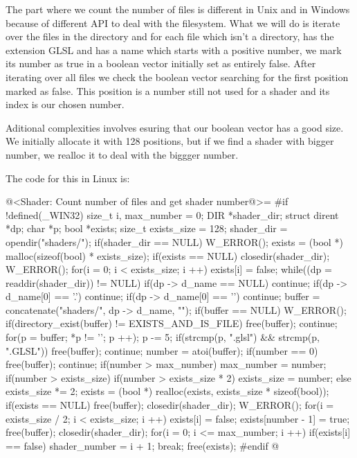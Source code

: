 {The part where we count the number of files is different in Unix and
in Windows because of different API to deal with the filesystem. What
we will do is iterate over the files in the
directory  and for each file which isn't a
directory, has the extension GLSL and has a name which starts with a
positive number, we mark its number as true in a boolean vector
initially set as entirely false. After iterating over all files we
check the boolean vector searching for the first position marked as
false. This position is a number still not used for a shader and its
index is our chosen number.

Aditional complexities involves esuring that our boolean vector has a
good size. We initially allocate it with 128 positions, but if we find
a shader with bigger number, we realloc it to deal with the biggger
number.

The code for this in Linux is:

\iniciocodigo
@<Shader: Count number of files and get shader number@>=
#if !defined(_WIN32)
{
  size_t i, max_number = 0;
  DIR *shader_dir;
  struct dirent *dp;
  char *p;
  bool *exists;
  size_t exists_size = 128;
  shader_dir = opendir("shaders/");
  if(shader_dir == NULL)
    W_ERROR();
  exists = (bool *) malloc(sizeof(bool) * exists_size);
  if(exists == NULL){
    closedir(shader_dir);
    W_ERROR();
  }
  for(i = 0; i < exists_size; i ++)
    exists[i] = false;
  while((dp = readdir(shader_dir)) != NULL){
    if(dp -> d_name == NULL) continue;
    if(dp -> d_name[0] == '.') continue;
    if(dp -> d_name[0] == '\0') continue;
    buffer = concatenate("shaders/", dp -> d_name, "");
    if(buffer == NULL) W_ERROR();
    if(directory_exist(buffer) != EXISTS_AND_IS_FILE){
      free(buffer);
      continue;
    }
    for(p = buffer; *p != '\0'; p ++);
    p -= 5;
    if(strcmp(p, ".glsl") && strcmp(p, ".GLSL")){
      free(buffer);
      continue;
    }
    number = atoi(buffer);
    if(number == 0){
      free(buffer);
      continue;
    }
    if(number > max_number)
      max_number = number;
    if(number > exists_size){
      if(number > exists_size * 2)
        exists_size = number;
      else
        exists_size *= 2;
      exists = (bool *) realloc(exists, exists_size * sizeof(bool));
      if(exists == NULL){
        free(buffer);
        closedir(shader_dir);
        W_ERROR();
      }
      for(i = exists_size / 2; i < exists_size; i ++)
        exists[i] = false;
    }
    exists[number - 1] = true;
    free(buffer);
  }
  closedir(shader_dir);
  for(i = 0; i <= max_number; i ++)
    if(exists[i] == false){
      shader_number = i + 1;
      break;
    }
  free(exists);
}
#endif
@
\fimcodigo

}
